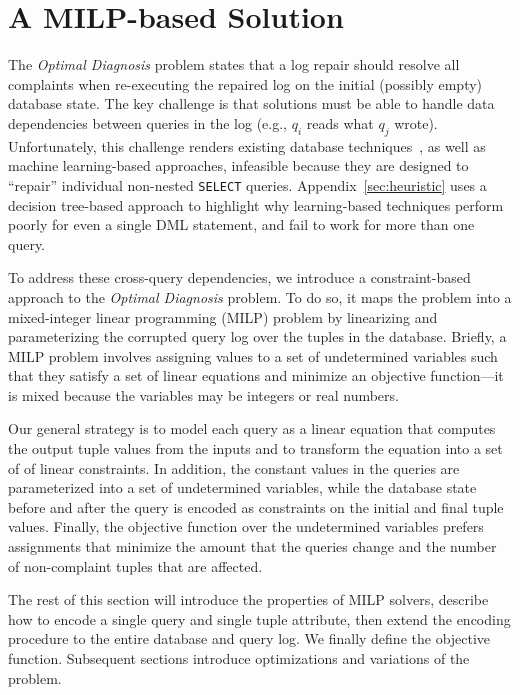 

\section{A MILP-based Solution}
\label{sec:sol}

The {\it Optimal Diagnosis} problem states that a log repair should resolve all complaints when re-executing the repaired log on the initial (possibly empty) database state.
The key challenge is that solutions must be able to handle data dependencies between queries in the log (e.g., $q_i$ reads what $q_j$ wrote).
Unfortunately, this challenge renders existing database techniques~\cite{Wu13,Chapman2009}, as well as machine learning-based approaches, infeasible because they are designed to ``repair'' individual non-nested \texttt{SELECT} queries.
Appendix~\ref{sec:heuristic} uses a decision tree-based approach to highlight why learning-based techniques perform poorly for even a single DML statement, and fail to work for more than one query.

To address these cross-query dependencies, we introduce a constraint-based approach to the {\it Optimal Diagnosis} problem.
To do so, it maps the problem into a mixed-integer linear programming (MILP) problem by linearizing and parameterizing the corrupted query log over the tuples in the database.
Briefly, a MILP problem involves assigning values to a set of undetermined variables such that they satisfy a set of linear equations and minimize an objective function---it is mixed because the variables may be integers or real numbers.

Our general strategy is to model each query as a linear equation that computes the output tuple values from the inputs and to transform the equation into a set of of linear constraints.   
In addition, the constant values in the queries are parameterized into a set of undetermined variables, while the database state before and after the query is encoded as constraints on the initial and final tuple values.
Finally, the objective function over the undetermined variables prefers assignments that minimize the amount that the queries change and the number of non-complaint tuples that are affected. 

The rest of this section will introduce the properties of MILP solvers, describe how to encode a single query and single tuple attribute, then extend the encoding procedure to the entire database and query log.
We finally define the objective function.
Subsequent sections introduce optimizations and variations of the problem.

